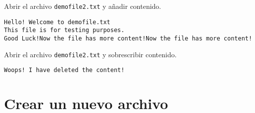 \begin{code} Abrir el archivo \texttt{demofile2.txt} y añadir contenido.

\begin{Shaded}
\begin{Highlighting}[]
\OperatorTok{=} \NormalTok{(}\NormalTok{, }\NormalTok{)}
\NormalTok{)}

\OperatorTok{=} \NormalTok{(}\NormalTok{, }\NormalTok{)}
\end{Highlighting}
\end{Shaded}

\begin{verbatim}
Hello! Welcome to demofile.txt
This file is for testing purposes.
Good Luck!Now the file has more content!Now the file has more content!

\end{verbatim}
\end{code}

\begin{code} Abrir el archivo \texttt{demofile2.txt} y sobrescribir contenido.

\begin{Shaded}
\begin{Highlighting}[]
\OperatorTok{=} \NormalTok{(}\NormalTok{, }\NormalTok{)}
\NormalTok{)}

\OperatorTok{=} \NormalTok{(}\NormalTok{, }\NormalTok{)}
\end{Highlighting}
\end{Shaded}

\begin{verbatim}
Woops! I have deleted the content!
\end{verbatim}
\end{code}

\section{Crear un nuevo archivo}

